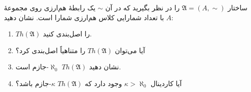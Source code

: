 ساختار $\mathfrak{A} = (A, \sim)$ را در نظر بگیرید که در آن $\sim$ یک رابطهٔ هم‌ارزی روی مجموعهٔ $A$ با تعداد شمارایی کلاس هم‌ارزی شمارا است. نشان دهید:
\begin{enumerate}[label=(\alph*)]
  \item $Th(\mathfrak{A})$ را اصل‌بندی کنید.
  \item آیا می‌توان $Th(\mathfrak{A})$ را متناهیاً اصل‌بندی کرد؟
  \item نشان دهید $Th(\mathfrak{A})$ $\aleph_0$-جازم است.
  \item آیا کاردینال $\kappa > \aleph_0$ وجود دارد که $Th(\mathfrak{A})$ $\kappa$-جازم باشد؟
\end{enumerate}\quad
\begin{ans}
\end{ans}
